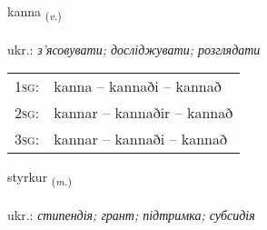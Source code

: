 \documentclass[frontgrid, backgrid]{flacards}\usepackage[]{graphicx}\usepackage[]{xcolor}
\begin{document}
\renewcommand{\flhead}{\vskip5pt \fboxsep=0pt {\small\bfseries\footnotesize Sagnorð | дієслово}}
\renewcommand{\fcfoot}{\vskip5pt \fboxsep=0pt \hspace{2pt}{\small\bfseries\footnotesize 1K}}

\renewcommand{\blhead}{\vskip5pt {\small\bfseries\footnotesize Sagnorð | дієслово }}
\renewcommand{\bcfoot}{\vskip5pt \hspace{2pt}{\small\bfseries\footnotesize 1K}}


{kanna \small{\textsubscript{(\textit{v.})}} \\[1ex] %
\textphonetic{[kʰana]} \\
ukr.: \emph{з'ясовувати; досліджувати; розглядати} \\  [2ex]
\renewcommand*{\arraystretch}{0.8}
\begin{tabular}{p{1cm}l}
\textsc{1sg}: & kanna -- kannaði -- kannað \\ 
\textsc{2sg}: & kannar -- kannaðir -- kannað \\ 
\textsc{3sg}: & kannar -- kannaði -- kannað \\ 
\end{tabular}
}

\renewcommand{\flhead}{\vskip5pt \fboxsep=0pt {\small\bfseries\footnotesize Nafnorð | іменник}}
\renewcommand{\fcfoot}{\vskip5pt \fboxsep=0pt \hspace{2pt}{\small\bfseries\footnotesize 1K}}

\renewcommand{\blhead}{\vskip5pt {\small\bfseries\footnotesize Nafnorð | іменник }}
\renewcommand{\bcfoot}{\vskip5pt \hspace{2pt}{\small\bfseries\footnotesize 1K}}


{styrkur \small{\textsubscript{(\textit{m.})}} \\[1ex] %
 \\
ukr.: \emph{стипендія; грант; підтримка; субсидія} \\  [2ex]
\renewcommand*{\arraystretch}{0.8}
}
\end{document}
